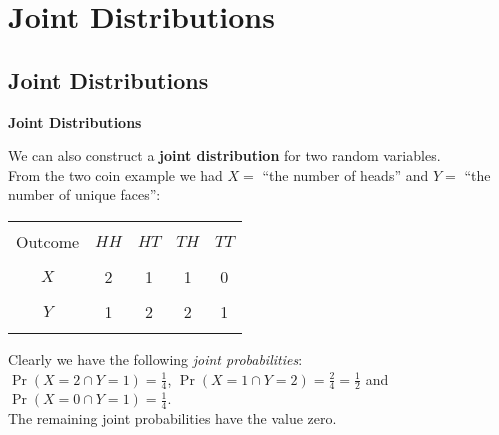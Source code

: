 \documentclass[compress]{beamer}        %
\makeatletter
\newcommand{\tcb}{\textcolor{beamer@blendedblue}}
\makeatother
\begin{document}
\section{Joint Distributions}
\subsection{Joint Distributions}
\begin{frame}{\bf \tcb{Joint Distributions}}

We can also construct a {\bf joint distribution} for two random variables.\\[0.9cm]

From the two coin example we had $X =$ ``the number of heads'' and $Y =$ ``the number of unique faces'':
\begin{center}
\begin{tabular}{|c|c|c|c|c|}
\hline
&&&&\\[-0.4cm]
Outcome  & $HH$ & $HT$ & $TH$ & $TT$ \\
\hline
&&&&\\[-0.4cm]
$X$ & 2 & 1 & 1 & 0 \\
\hline
&&&&\\[-0.4cm]
$Y$ & 1 & 2 & 2 & 1 \\
\hline
\multicolumn{5}{c}{}\\
\end{tabular}
\end{center}

Clearly we have the following \emph{joint probabilities}:\\[0.1cm]
$\Pr(X=2 \cap Y=1) = \frac{1}{4}$, $\Pr(X=1 \cap Y=2) = \frac{2}{4} = \frac{1}{2}$ and\\[0.1cm]
$\Pr(X=0 \cap Y=1) = \frac{1}{4}$.\\[0.3cm]

The remaining joint probabilities have the value zero.

\end{frame}
\end{document}
